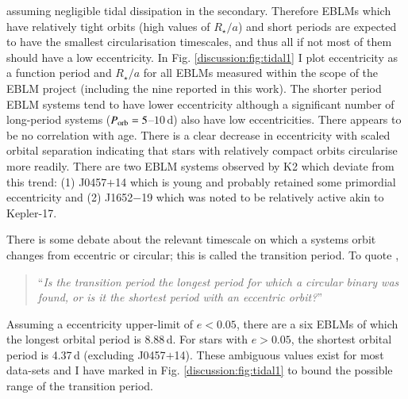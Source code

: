 assuming negligible tidal dissipation in the secondary. Therefore EBLMs which have relatively tight orbits (high values of $R_\star / a$) and short periods are expected to have the smallest circularisation timescales, and thus all if not most of them should have a low eccentricity. In Fig. \ref{discussion:fig:tidal1} I plot eccentricity as a function period and $R_\star / a$ for all EBLMs measured within the scope of the EBLM project (including the nine reported in this work). The shorter period EBLM systems tend to have lower eccentricity although a significant number of long-period systems ($P_{\rm orb} = 5$--$10$\,d) also have low eccentricities. There appears to be no correlation with age. There is a clear decrease in eccentricity with scaled orbital separation indicating that stars with relatively compact orbits circularise more readily. There are two EBLM systems observed by K2 which deviate from this trend: (1) J0457$+$14 which is young and probably retained some primordial eccentricity and (2) J1652$-$19 which was noted to be relatively active akin to Kepler-17. 

There is some debate about the relevant timescale on which a systems orbit changes from eccentric or circular; this is called the transition period. To quote  \citet{2010A&ARv..18...67T},
%
\begin{quote}
``{\it Is the transition period the longest period for which a circular binary was found, or is it the shortest period with an eccentric orbit?}''
\end{quote}
%
Assuming a eccentricity upper-limit of $e < 0.05$, there are a six EBLMs of which the longest orbital period is 8.88\,d. For stars with $e > 0.05$, the shortest orbital period is 4.37\,d (excluding J0457$+$14). These ambiguous values exist for most data-sets and I have marked in Fig. \ref{discussion:fig:tidal1} to bound the possible range of the transition period.

